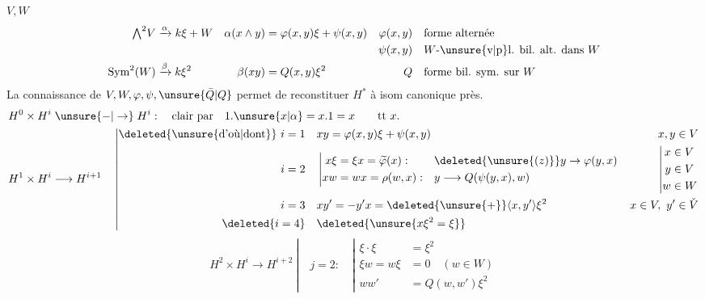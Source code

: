 
$V,W$
\[
\begin{aligned}
{\textstyle\bigwedge}^{2}V&\xrightarrow{\alpha}k\xi+W&
\alpha(x\wedge y)&=\varphi(x,y)\xi+\psi(x,y)&
\varphi(x,y)&\quad\text{forme alternée}\\
&&&&\psi(x,y)&\quad\text{$W$-\unsure{v|p}l. bil. alt. dans $W$}\\
\operatorname{Sym}^{2}(W)&\xrightarrow{\beta}k\xi^2&
\beta(xy)&=Q(x,y)\xi^2&
Q&\quad\text{forme bil. sym. sur $W$}
\end{aligned}
\]
 La connaissance de $V,W,\varphi,\psi,\unsure{\bar Q|Q}$ permet de reconstituer $H^*$ à isom canonique près.
\[
\begin{aligned}
H^0\times H^i&\mathrel{\unsure{-|\to}}H^i:\quad\text{clair par}\quad 1.\unsure{x|\alpha}=x.1=x\qquad\text{tt }x.\\
H^1\times H^i&\longrightarrow H^{i+1}\quad\left|
\begin{aligned}
\deleted{\unsure{\text{d'où}|\text{dont}}}\ i=1\quad &xy=\varphi(x,y)\xi+\psi(x,y) &x,y\in V\\
i=2\quad &\left|\begin{aligned}
x\xi&=\xi x=\widetilde\varphi(x): &&\deleted{\unsure{(z)}}y\to\varphi(y,x)\\
xw&=wx=\rho(w,x):&&y\longrightarrow Q(\psi(y,x),w)
\end{aligned}\right. &\left|\begin{aligned}x&\in V\\y&\in V\\w&\in W\end{aligned}\right.\\
i=3\quad &xy'=-y'x=\deleted{\unsure{+}}\langle x,y'\rangle\xi^2 &x\in V,\ y'\in\check V\\
\deleted{i=4}\quad &\deleted{\unsure{x\xi^2=\xi}}
\end{aligned}\right.
\end{aligned}
\]
\[
H^2\times H^i\longrightarrow H^{i+2}\ \left|\quad j=2:\quad
\left|\begin{aligned}
\xi\cdot\xi&=\xi^2\\
\xi w=w\xi&=0\quad(w\in W)\\
ww'&=Q(w,w')\xi^2
\end{aligned}\right.\right.
\]


